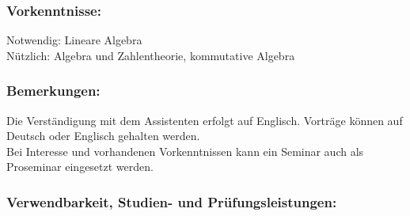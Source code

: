 \documentclass[a4paper,10pt]{article}
\begin{document}
\subsubsection*{\large
    Vorkenntnisse:
}
Notwendig: Lineare Algebra \\
Nützlich: Algebra und Zahlentheorie, kommutative Algebra
\subsubsection*{\large
    Bemerkungen:
}
Die Verständigung mit dem Assistenten erfolgt auf Englisch. Vorträge können auf Deutsch oder Englisch gehalten werden. \\
Bei Interesse und vorhandenen Vorkenntnissen kann ein Seminar auch als Proseminar eingesetzt werden.
\subsubsection*{\large
    Verwendbarkeit, Studien- und Prüfungsleistungen:
}
\end{document}
